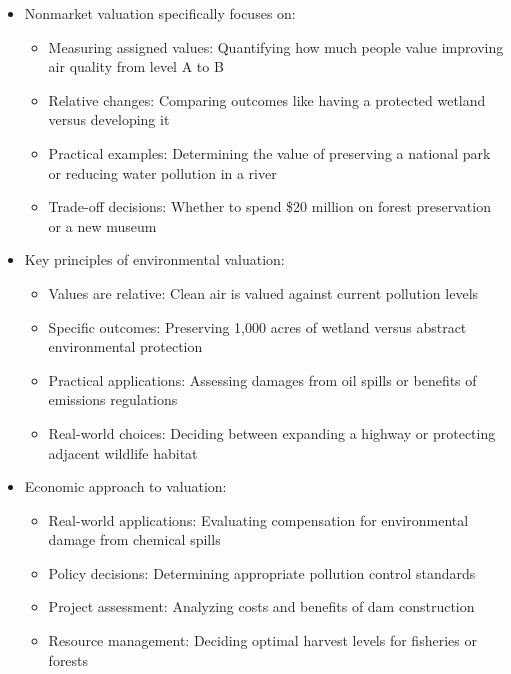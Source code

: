 \documentclass[
  ignorenonframetext,
]{beamer}
\providecommand{\tightlist}{%
  \setlength{\itemsep}{0pt}\setlength{\parskip}{0pt}}\usepackage{longtable,booktabs,array}
\begin{document}
\begin{frame}
\begin{itemize}
\tightlist
\item
  Nonmarket valuation specifically focuses on:

  \begin{itemize}
  \tightlist
  \item
    Measuring assigned values: Quantifying how much people value
    improving air quality from level A to B
  \item
    Relative changes: Comparing outcomes like having a protected wetland
    versus developing it
  \item
    Practical examples: Determining the value of preserving a national
    park or reducing water pollution in a river
  \item
    Trade-off decisions: Whether to spend \$20 million on forest
    preservation or a new museum
  \end{itemize}
\item
  Key principles of environmental valuation:

  \begin{itemize}
  \tightlist
  \item
    Values are relative: Clean air is valued against current pollution
    levels
  \item
    Specific outcomes: Preserving 1,000 acres of wetland versus abstract
    environmental protection
  \item
    Practical applications: Assessing damages from oil spills or
    benefits of emissions regulations
  \item
    Real-world choices: Deciding between expanding a highway or
    protecting adjacent wildlife habitat
  \end{itemize}
\end{itemize}
\end{frame}

\begin{frame}
\begin{itemize}
\tightlist
\item
  Economic approach to valuation:

  \begin{itemize}
  \tightlist
  \item
    Real-world applications: Evaluating compensation for environmental
    damage from chemical spills
  \item
    Policy decisions: Determining appropriate pollution control
    standards
  \item
    Project assessment: Analyzing costs and benefits of dam construction
  \item
    Resource management: Deciding optimal harvest levels for fisheries
    or forests
  \end{itemize}
\end{itemize}
\end{frame}
\end{document}
